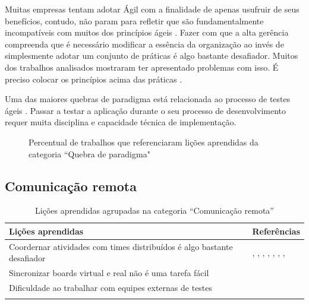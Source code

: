 Muitas empresas tentam adotar Ágil com a finalidade de apenas usufruir de seus benefícios, contudo, não param para refletir que são fundamentalmente incompatíveis com muitos dos princípios ágeis \cite{Lapham2012,Bastos2013}. Fazer com que a alta gerência compreenda que é necessário modificar a essência da organização ao invés de simplesmente adotar um conjunto de práticas é algo bastante desafiador. Muitos dos trabalhos analisados mostraram ter apresentado problemas com isso. É preciso colocar os princípios acima das práticas \cite{Maciel2013}.

Uma das maiores quebras de paradigma está relacionada ao processo de testes ágeis \cite{Korhonen2010}. Passar a testar a aplicação durante o seu processo de desenvolvimento requer muita disciplina e capacidade técnica de implementação.

\begin{figure}[H]
	\centering
	\captionsetup{justification=centering}
	\caption{Percentual de trabalhos que referenciaram lições aprendidas da categoria ``Quebra de paradigma"}
	\label{fig:paradigma}
\end{figure}

\subsection{Comunicação remota}

\begin{table}[H]
	\centering
	\captionsetup{justification=centering}
	\begin{tabularx}{\linewidth}{ | X | p{5cm} | } \hline \textbf{Lições aprendidas} & \textbf{Referências} \\ \hline
		Coordernar atividades com times distribuídos é algo bastante desafiador & \cite{Adobe2012}, \cite{Microsoft2013}, \cite{Korhonen2010}, \cite{Radha2012}, \cite{Rodrigues2013}, \cite{Vieira2013}, \cite{Bastos2013}, \cite{Maciel2013} \\ \hline
		Sincronizar boards virtual e real não é uma tarefa fácil & \cite{Vieira2013} \\ \hline
		Dificuldade ao trabalhar com equipes externas de testes & \cite{Bastos2013} \\ \hline
	\caption{Lições aprendidas agrupadas na categoria ``Comunicação remota''}
	\end{tabularx}
\end{table}

